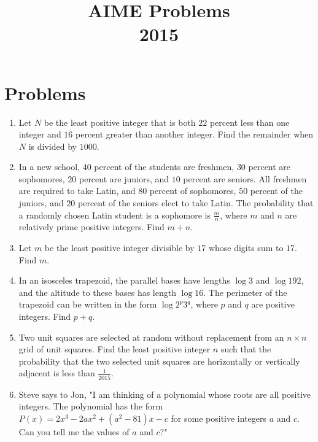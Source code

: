 \documentclass{article}
\title{AIME Problems \\ 2015}
\date{}
\begin{document}
\maketitle\thispagestyle{fancy}\newpage\section*{Problems}\begin{enumerate}[label=\arabic*., itemsep=0.5em]\item Let $N$ be the least positive integer that is both $22$ percent less than one integer and $16$ percent greater than another integer. Find the remainder when $N$ is divided by $1000$.\par \vspace{0.5em}\item In a new school, $40$ percent of the students are freshmen, $30$ percent are sophomores, $20$ percent are juniors, and $10$ percent are seniors. All freshmen are required to take Latin, and $80$ percent of sophomores, $50$ percent of the juniors, and $20$ percent of the seniors elect to take Latin. The probability that a randomly chosen Latin student is a sophomore is $\frac{m}{n}$, where $m$ and $n$ are relatively prime positive integers. Find $m+n$.\par \vspace{0.5em}\item Let $m$ be the least positive integer divisible by $17$ whose digits sum to $17$. Find $m$.\par \vspace{0.5em}\item In an isosceles trapezoid, the parallel bases have lengths $\log 3$ and $\log 192$, and the altitude to these bases has length $\log 16$. The perimeter of the trapezoid can be written in the form $\log 2^p 3^q$, where $p$ and $q$ are positive integers. Find $p + q$.\par \vspace{0.5em}\item Two unit squares are selected at random without replacement from an $n \times n$ grid of unit squares. Find the least positive integer $n$ such that the probability that the two selected unit squares are horizontally or vertically adjacent is less than $\frac{1}{2015}$.\par \vspace{0.5em}\item Steve says to Jon, "I am thinking of a polynomial whose roots are all positive integers. The polynomial has the form $P(x) = 2x^3-2ax^2+(a^2-81)x-c$ for some positive integers $a$ and $c$. Can you tell me the values of $a$ and $c$?"


\end{enumerate}
\end{document}
